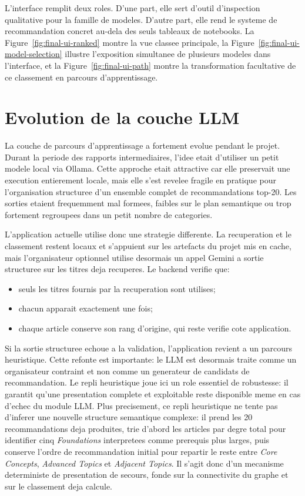 L'interface remplit deux roles. D'une part, elle sert d'outil d'inspection
qualitative pour la famille de modeles. D'autre part, elle rend le systeme de
recommandation concret au-dela des seuls tableaux de notebooks. La
Figure~\ref{fig:final-ui-ranked} montre la vue classee principale,
la Figure~\ref{fig:final-ui-model-selection} illustre l'exposition simultanee
de plusieurs modeles dans l'interface, et la Figure~\ref{fig:final-ui-path}
montre la transformation facultative de ce classement en parcours
d'apprentissage.

\section{Evolution de la couche LLM}

La couche de parcours d'apprentissage a fortement evolue pendant le projet.
Durant la periode des rapports intermediaires, l'idee etait d'utiliser un
petit modele local via Ollama. Cette approche etait attractive car elle
preservait une execution entierement locale, mais elle s'est revelee fragile
en pratique pour l'organisation structuree d'un ensemble complet de
recommandations top-20. Les sorties etaient frequemment mal formees, faibles
sur le plan semantique ou trop fortement regroupees dans un petit nombre de
categories.

L'application actuelle utilise donc une strategie differente. La recuperation
et le classement restent locaux et s'appuient sur les artefacts du projet mis
en cache, mais l'organisateur optionnel utilise desormais un appel Gemini a
sortie structuree sur les titres deja recuperes. Le backend verifie que:
\begin{itemize}
    \item seuls les titres fournis par la recuperation sont utilises;
    \item chacun apparait exactement une fois;
    \item chaque article conserve son rang d'origine, qui reste verifie cote
    application.
\end{itemize}

Si la sortie structuree echoue a la validation, l'application revient a un
parcours heuristique. Cette refonte est importante: le LLM est desormais traite
comme un organisateur contraint et non comme un generateur de candidats de
recommandation. Le repli heuristique joue ici un role essentiel de robustesse:
il garantit qu'une presentation complete et exploitable reste disponible meme
en cas d'echec du module LLM. Plus precisement, ce repli heuristique ne tente
pas d'inferer une nouvelle structure semantique complexe: il prend les 20
recommandations deja produites, trie d'abord les articles par degre total pour
identifier cinq \textit{Foundations} interpretees comme prerequis plus larges,
puis conserve l'ordre de recommandation initial pour repartir le reste entre
\textit{Core Concepts}, \textit{Advanced Topics} et \textit{Adjacent Topics}.
Il s'agit donc d'un mecanisme deterministe de presentation de secours, fonde
sur la connectivite du graphe et sur le classement deja calcule.


